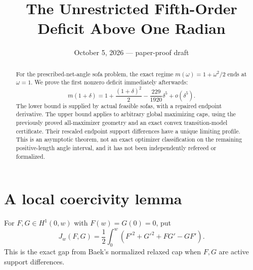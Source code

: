 \documentclass[11pt]{article}
\title{The Unrestricted Fifth-Order Deficit Above One Radian}
\author{}\date{October 5, 2026 --- paper-proof draft}
\begin{document}
\maketitle
\begin{abstract}
For the prescribed-net-angle sofa problem, the exact regime $m(\omega)=1+\omega^2/2$ ends at $\omega=1$. We prove the first nonzero deficit immediately afterwards:
\[
 m(1+\delta)=1+\frac{(1+\delta)^2}{2}-\frac{229}{1920}\delta^5+o(\delta^5).
\]
The lower bound is supplied by actual feasible sofas, with a repaired endpoint derivative. The upper bound applies to arbitrary global maximizing caps, using the previously proved all-maximizer geometry and an exact convex transition-model certificate. Their rescaled endpoint support differences have a unique limiting profile. This is an asymptotic theorem, not an exact optimizer classification on the remaining positive-length angle interval, and it has not been independently refereed or formalized.
\end{abstract}

\section{A local coercivity lemma}
For $F,G\in H^1(0,w)$ with $F(w)=G(0)=0$, put
\[
 J_w(F,G)=\frac12\int_0^w(F'^2+G'^2+F G'-G F').
\]
This is the exact gap from Baek's normalized relaxed cap when $F,G$ are active support differences.
\end{document}

